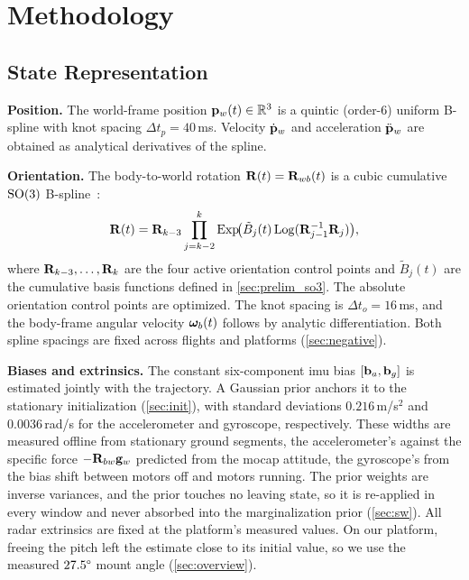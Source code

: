 \section{Methodology}
\label{sec:method}

\subsection{State Representation}
\label{sec:state}

\textbf{Position.}
The world-frame position $\mathbf{p}_w(t) \in \mathbb{R}^3$ is a quintic
(order-6) uniform B-spline with knot spacing $\Delta t_p = 40$\,ms.
Velocity $\dot{\mathbf{p}}_w$ and acceleration $\ddot{\mathbf{p}}_w$ are
obtained as analytical derivatives of the spline.

\textbf{Orientation.}
The body-to-world rotation $\mathbf{R}(t)=\mathbf{R}_{wb}(t)$ is a cubic
cumulative $\mathrm{SO}(3)$ B-spline~\cite{sommer2020efficient,usenko2020basalt}:
\begin{equation}
  \mathbf{R}(t) = \mathbf{R}_{k-3}
           \prod_{j=k-2}^{k} \mathrm{Exp}\!\bigl(\tilde{B}_j(t)\,
           \mathrm{Log}(\mathbf{R}_{j-1}^{-1}\mathbf{R}_{j})\bigr),
  \label{eq:ori_spline}
\end{equation}
where $\mathbf{R}_{k-3},\ldots,\mathbf{R}_k$ are the four active orientation control points
and $\tilde{B}_j(t)$ are the cumulative basis functions defined in
\autoref{sec:prelim_so3}.  The absolute orientation control points are optimized.
The knot spacing is $\Delta t_o = 16$\,ms, and the body-frame angular
velocity $\boldsymbol{\omega}_b(t)$ follows by analytic differentiation.
Both spline spacings are fixed across flights and platforms
(\autoref{sec:negative}).

\textbf{Biases and extrinsics.}
The constant six-component \ac{imu} bias $[\mathbf{b}_a,\mathbf{b}_g]$ is estimated
jointly with the trajectory.  A Gaussian prior anchors it to the
stationary initialization (\autoref{sec:init}), with standard
deviations $0.216$\,m/s$^2$ and $0.0036$\,rad/s for the accelerometer
and gyroscope, respectively.  These widths are measured offline from stationary ground segments,
the accelerometer's against the specific force $-\mathbf{R}_{bw}\mathbf{g}_w$
predicted from the \ac{mocap} attitude, the gyroscope's from the
bias shift between motors off and motors running.  The prior weights are inverse variances, and the prior touches no leaving state, so it is re-applied in every window and never absorbed into the marginalization prior (\autoref{sec:sw}).
All radar extrinsics are fixed at the platform's measured values.
On our platform, freeing the pitch left the estimate close to its
initial value, so we use the measured $27.5\degree$ mount angle
(\autoref{sec:overview}).

